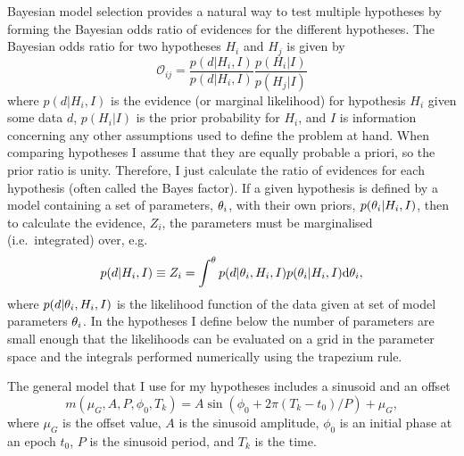 \documentclass[doublecol]{epl2}
\begin{document}
Bayesian model selection provides a natural way to test multiple hypotheses by forming the Bayesian odds ratio of
evidences for the different hypotheses. The Bayesian odds ratio for two hypotheses $H_i$ and $H_j$ is given by
\begin{equation}
 \mathcal{O}_{ij} = \frac{p(d|H_i,I)}{p(d|H_i,I)}\frac{p(H_i|I)}{p(H_j|I)}
\end{equation}
where $p(d|H_i,I)$ is the evidence (or marginal likelihood) for hypothesis $H_i$ given some data $d$,
$p(H_i|I)$ is the prior probability for $H_i$, and $I$ is information concerning any other assumptions used to
define the problem at hand. When comparing hypotheses I assume that they are equally
probable a priori, so the prior ratio is unity. Therefore, I just calculate
the ratio of evidences for each hypothesis (often called the Bayes factor). If a given hypothesis is defined
by a model containing a set of parameters, $\mathbf{\theta}_i$, with their own priors,
$p(\mathbf{\theta}_i|H_i,I)$, then to calculate the evidence, $Z_i$, the parameters must be marginalised (i.e.\ integrated)
over, e.g.\
\begin{equation}\label{eq:evidence}
 p(d|H_i,I) \equiv Z_i = \int^{\mathbf{\theta}} p(d|\mathbf{\theta}_i,H_i,I) p(\mathbf{\theta}_i|H_i,I) {\rm d}\mathbf{\theta}_i,
\end{equation}
where $p(d|\mathbf{\theta}_i,H_i,I)$ is the likelihood function of the data given at set of model parameters $\mathbf{\theta}_i$.
In the hypotheses I define below the number of parameters are small enough that the likelihoods can be evaluated on a grid in the parameter space and the integrals performed numerically using the trapezium rule.

The general model that I use for my hypotheses includes a sinusoid and an offset
\begin{equation}\label{eq:model}
 m(\mu_G, A, P, \phi_0, T_k) = A\sin{(\phi_0 + 2\pi (T_k-t_0)/P)} + \mu_G,
\end{equation}
where $\mu_G$ is the offset value, $A$ is the sinusoid amplitude, $\phi_0$ is an initial phase at an epoch $t_0$,
$P$ is the sinusoid period, and $T_k$ is the time.
\end{document}
